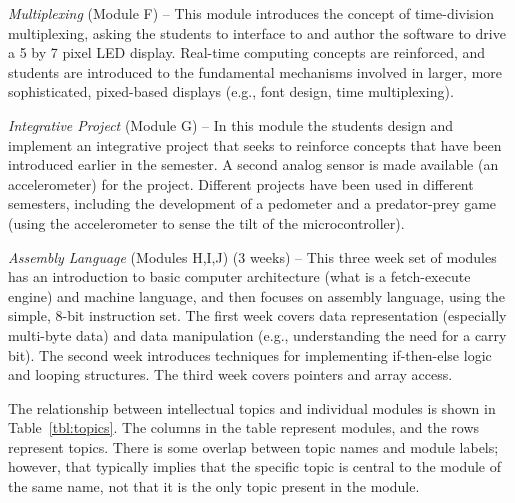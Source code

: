 \emph{Multiplexing} (Module F) --
This module introduces the concept of time-division multiplexing, asking the
students to interface to and author the software to drive a 5 by 7 pixel
LED display. Real-time computing concepts are reinforced, and students
are introduced to the fundamental mechanisms involved in larger, more
sophisticated, pixed-based displays (e.g., font design, time multiplexing).

\emph{Integrative Project} (Module G) --
In this module the students design and implement an integrative project
that seeks to reinforce concepts that have been introduced earlier in the
semester.  A second analog sensor is made available (an accelerometer)
for the project.
Different projects have been used in different semesters, including
the development of a pedometer and a predator-prey game (using the
accelerometer to sense the tilt of the microcontroller).

\emph{Assembly Language} (Modules H,I,J) (3 weeks) --
This three week set of modules has an introduction to basic computer
architecture (what is a fetch-execute engine) and machine language, and then
focuses on assembly language, using the simple, 8-bit instruction set.
The first week covers data representation (especially multi-byte
data) and data manipulation
(e.g., understanding the need for a carry bit).
The second week introduces techniques for implementing if-then-else logic
and looping structures.
The third week covers pointers and array access.

The relationship between intellectual topics and individual modules is
shown in Table~\ref{tbl:topics}. The columns in the table represent
modules, and the rows represent topics.
There is some overlap between topic names and module labels; however, that
typically implies that the specific topic is central to the module of the
same name, not that it is the only topic present in the module.

